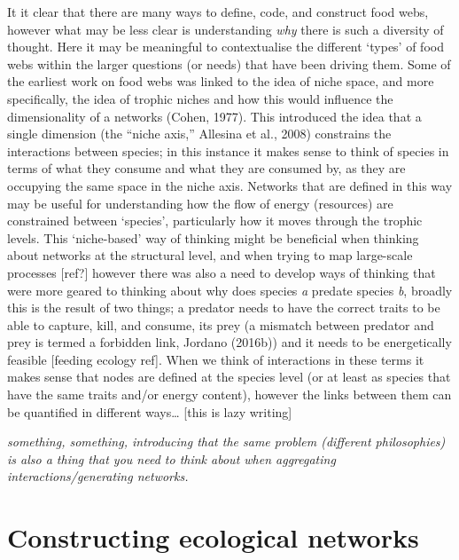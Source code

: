 \documentclass[
]{article}
\begin{document}
It it clear that there are many ways to define, code, and construct food
webs, however what may be less clear is understanding \emph{why} there
is such a diversity of thought. Here it may be meaningful to
contextualise the different `types' of food webs within the larger
questions (or needs) that have been driving them. Some of the earliest
work on food webs was linked to the idea of niche space, and more
specifically, the idea of trophic niches and how this would influence
the dimensionality of a networks (Cohen, 1977). This introduced the idea
that a single dimension (the ``niche axis,'' Allesina et al., 2008)
constrains the interactions between species; in this instance it makes
sense to think of species in terms of what they consume and what they
are consumed by, as they are occupying the same space in the niche axis.
Networks that are defined in this way may be useful for understanding
how the flow of energy (resources) are constrained between `species',
particularly how it moves through the trophic levels. This `niche-based'
way of thinking might be beneficial when thinking about networks at the
structural level, and when trying to map large-scale processes
{[}ref?{]} however there was also a need to develop ways of thinking
that were more geared to thinking about why does species \emph{a}
predate species \emph{b}, broadly this is the result of two things; a
predator needs to have the correct traits to be able to capture, kill,
and consume, its prey (a mismatch between predator and prey is termed a
forbidden link, Jordano (2016b)) and it needs to be energetically
feasible {[}feeding ecology ref{]}. When we think of interactions in
these terms it makes sense that nodes are defined at the species level
(or at least as species that have the same traits and/or energy
content), however the links between them can be quantified in different
ways\ldots{} {[}this is lazy writing{]}

\emph{something, something, introducing that the same problem (different
philosophies) is also a thing that you need to think about when
aggregating interactions/generating networks.}

\section{Constructing ecological
networks}\label{constructing-ecological-networks}
\end{document}
